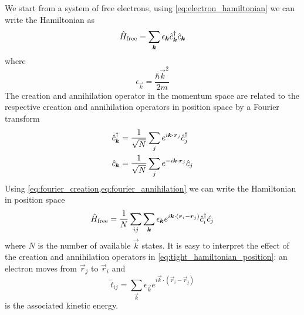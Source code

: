 We start from a system of free electrons, using \cref{eq:electron_hamiltonian} we can write the Hamiltonian as
\begin{equation}
    \hat{H}_\text{free} = \sum_{\mathbf{\boldsymbol{k}}} \epsilon_{\mathbf{\boldsymbol{k}}} \hat{c}^\dagger_{\mathbf{\boldsymbol{k}}}\hat{c}_{\mathbf{\boldsymbol{k}}}
\end{equation}
where
\begin{equation} \label{eq:tight_free_disperion}
    \epsilon_{\vec{k}} = \frac{\hbar\vec{k}^2}{2m}
\end{equation}
The creation and annihilation operator in the momentum space are related to the respective creation and annihilation operators in position space by a Fourier transform
\begin{align} \label{eq:fourier_creation}
    \hat{c}^\dagger_{\mathbf{\boldsymbol{k}}} & = \frac{1}{\sqrt{N}} \sum_j e^{i\mathbf{\boldsymbol{k}}\cdot\mathbf{\boldsymbol{r}}_j} \hat{c}^\dagger_j \\ \label{eq:fourier_annihilation}
    \hat{c}_{\mathbf{\boldsymbol{k}}}  & = \frac{1}{\sqrt{N}} \sum_j e^{-i\mathbf{\boldsymbol{k}}\cdot\mathbf{\boldsymbol{r}}_j} \hat{c}_j
\end{align}
Using \cref{eq:fourier_creation,eq:fourier_annihilation} we can write the Hamiltonian in position space
\begin{equation} \label{eq:tight_hamiltonian_position}
    \hat{H}_\text{free} = \frac{1}{N} \sum_{ij} \sum_{\mathbf{\boldsymbol{k}}} \epsilon_{\mathbf{\boldsymbol{k}}} e^{i\mathbf{\boldsymbol{k}}\cdot(\mathbf{\boldsymbol{r}}_i - \mathbf{\boldsymbol{r}}_j)} \hat{c}^\dagger_i\hat{c_j}
\end{equation}
where $N$ is the number of available $\vec{k}$ states. It is easy to interpret the effect of the creation and annihilation operators in \cref{eq:tight_hamiltonian_position}: an electron moves from $\vec{r}_j$ to $\vec{r}_i$ and
\begin{equation}
    \tilde{t}_{ij} = \sum_\vec{k} \epsilon_{\vec{k}} e^{i\vec{k}\cdot(\vec{r}_i - \vec{r}_j)}
\end{equation}
is the associated kinetic energy.

